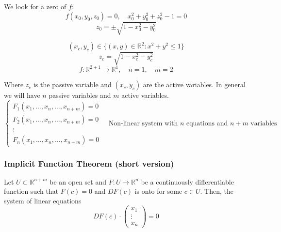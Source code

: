 \documentclass[11pt]{article}
\begin{document}
\begin{center}
\end{center}

We look for a zero of $f$:
\[
f(x_0,y_0,z_0) = 0, \quad x_0^2 + y_0^2 + z_0^2 - 1 = 0
\]
\[
z_0 = \pm \sqrt{1 - x_0^2 - y_0^2}
\]

\[
(x_c,y_c) \in \{(x,y) \in \mathbb{R}^2 : x^2 + y^2 \leq 1\}
\]
\[
z_c = \sqrt{1 - x_c^2 - y_c^2}
\]
\[
f : \mathbb{R}^{2+1} \rightarrow \mathbb{R}^1, \quad n = 1, \quad m = 2
\]

Where $z_c$ is the passive variable and $(x_c,y_c)$ are the active variables. In general we will have $n$ passive variables and $m$ active variables.
\[
\begin{cases}
    F_1(x_1, \ldots, x_n, \ldots, x_{n+m}) = 0 \\
    F_2(x_1, \ldots, x_n, \ldots, x_{n+m}) = 0 \\
    \vdots \\
    F_n(x_1, \ldots, x_n, \ldots, x_{n+m}) = 0
\end{cases}
\quad \text{Non-linear system with } n \text{ equations and } n+m \text{ variables}
\]

\subsubsection{Implicit Function Theorem (short version)}
Let $U \subset \mathbb{R}^{n+m}$ be an open set and $F : U \rightarrow \mathbb{R}^n$ be a continuously differentiable function such that $F(c) = 0$ and $DF(c)$ is onto for some $c \in U$. Then, the system of linear equations
\[
DF(c) \cdot \begin{pmatrix}
    x_1 \\
    \vdots \\
    x_n
\end{pmatrix} = 0
\]
\end{document}
